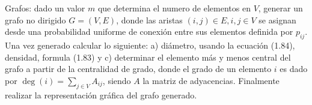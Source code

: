 \documentclass[letterpaper,11pt]{article}
\begin{document}
Grafos: dado un valor $m$ que determina el numero de elementos en $V$, generar un grafo no dirigido $G=(V,E)$, donde las aristas $(i,j)\in E, i,j\in V$ se asignan desde una probabilidad uniforme de conexión entre sus elementos definida por $p_{ij}$. Una vez generado calcular lo siguiente: a) diámetro, usando la ecuación (1.84), densidad, formula (1.83) y c) determinar el elemento más y menos central del grafo a partir de la centralidad de grado, donde el grado de un elemento $i$ es dado por $\deg(i) = \sum_{j\in V} A_{ij}$, siendo $A$ la matriz de adyacencias. Finalmente realizar la representación gráfica del grafo generado.
\end{document}
